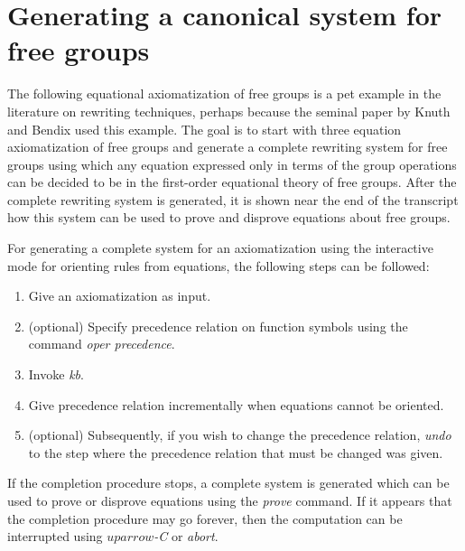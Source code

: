 \chapter{Generating a canonical system for free groups}
\normalsize
\rm
The following equational axiomatization of free groups is a pet
example in the literature on rewriting techniques, perhaps because the
seminal paper by Knuth and Bendix used this example.  The goal is to
start with three equation axiomatization of free groups and generate a
complete rewriting system for free groups using which any equation
expressed only in terms of the group operations can be decided to be
in the first-order equational theory of free groups. After the
complete rewriting system is generated, it is shown near the end of
the transcript how this system can be used to prove and disprove
equations about free groups.

For generating a complete system for an axiomatization using the
interactive mode for orienting rules from equations, the following
steps can be followed: 
\begin{enumerate}
\item Give an axiomatization as input.
\item (optional) Specify precedence relation on function symbols
using the command {\em oper precedence}.
\item Invoke {\em kb}.
\item Give precedence relation incrementally when equations cannot be
oriented.
\item (optional) Subsequently, if you wish to change the 
precedence relation, {\em undo} to the step where
the precedence relation that must be changed was given.
\end{enumerate}
If the completion procedure stops, a complete system is generated
which can be used to prove or disprove equations using
the {\em prove} command. If it appears that the completion procedure
may go forever, then the computation can be interrupted
using {\em $uparrow$-C} or {\em abort}.


